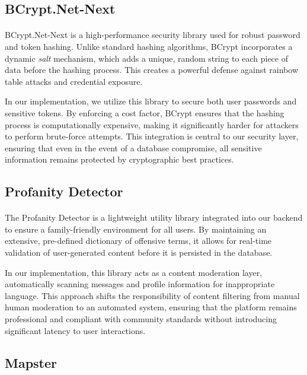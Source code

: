 \subsection{BCrypt.Net-Next}
\paragraph{}BCrypt.Net-Next \cite{bcrypt} is a high-performance security library used for robust password and token hashing. Unlike standard hashing algorithms, BCrypt incorporates a dynamic \textit{salt} mechanism, which adds a unique, random string to each piece of data before the hashing process. This creates a powerful defense against rainbow table attacks and credential exposure.

In our implementation, we utilize this library to secure both user passwords and sensitive tokens. By enforcing a cost factor, BCrypt ensures that the hashing process is computationally expensive, making it significantly harder for attackers to perform brute-force attempts. This integration is central to our security layer, ensuring that even in the event of a database compromise, all sensitive information remains protected by cryptographic best practices.


\subsection{Profanity Detector}
\paragraph{}The Profanity Detector \cite{profanitydetector} is a lightweight utility library integrated into our backend to ensure a family-friendly environment for all users. By maintaining an extensive, pre-defined dictionary of offensive terms, it allows for real-time validation of user-generated content before it is persisted in the database.

In our implementation, this library acts as a content moderation layer, automatically scanning messages and profile information for inappropriate language. This approach shifts the responsibility of content filtering from manual human moderation to an automated system, ensuring that the platform remains professional and compliant with community standards without introducing significant latency to user interactions.

\subsection{Mapster}
